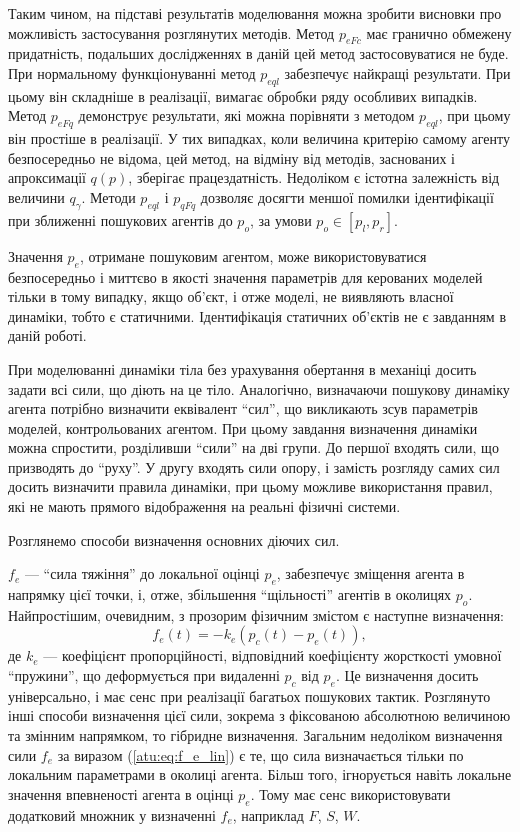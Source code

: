 \documentclass[a4paper,13pt]{atuaref}
\begin{document}
Таким чином, на підставі результатів моделювання можна зробити висновки про
можливість застосування розглянутих методів. Метод $ p_{eFc} $ має гранично
обмежену придатність, подальших дослідженнях в даній цей метод застосовуватися
не буде. При нормальному функціонуванні метод $ p_{eql} $ забезпечує найкращі
результати. При цьому він складніше в реалізації, вимагає обробки ряду
особливих випадків. Метод $ p_{eFq} $ демонструє результати, які можна
порівняти з методом $ p_ {eql} $, при цьому він простіше в реалізації. У тих
випадках, коли величина критерію самому агенту безпосередньо не відома, цей
метод, на відміну від методів, заснованих і апроксимації $ q (p) $, зберігає
працездатність. Недоліком є істотна залежність від величини $ q_\gamma $.
Методи $ p_ {eql} $ і $ p_ {qFq} $ дозволяє досягти меншої помилки
ідентифікації при зближенні пошукових агентів до $ p_o $, за умови $ p_o \in [p_l, p_r] $.



Значення $ p_e $, отримане пошуковим агентом, може використовуватися
безпосередньо і миттєво в якості значення параметрів для керованих моделей
тільки в тому випадку, якщо об'єкт, і отже моделі, не виявляють власної
динаміки, тобто є статичними. Ідентифікація статичних об'єктів не є завданням в
даній роботі.

При моделюванні динаміки тіла без урахування обертання в механіці досить задати
всі сили, що діють на це тіло. Аналогічно, визначаючи пошукову динаміку агента
потрібно визначити еквівалент ``сил'', що викликають зсув параметрів моделей,
контрольованих агентом. При цьому завдання визначення динаміки можна спростити,
розділивши ``сили'' на дві групи. До першої входять сили, що призводять до ``руху''.
У другу входять сили опору, і замість розгляду самих сил досить
визначити правила динаміки, при цьому можливе використання правил, які не мають
прямого відображення на реальні фізичні системи.

Розглянемо способи визначення основних діючих сил.

$f_e $ --- ``сила тяжіння'' до локальної оцінці $ p_e $, забезпечує зміщення
агента в напрямку цієї точки, і, отже, збільшення ``щільності'' агентів в
околицях $p_o$. Найпростішим, очевидним, з прозорим фізичним змістом є
наступне визначення:
%
\begin{equation}
  f_e(t) = - k_e \left( p_c(t) - p_e(t) \right)  ,
  \label{atu:eq:f_e_lin}
\end{equation}
%
де $ k_e $ --- коефіцієнт пропорційності, відповідний коефіцієнту жорсткості
умовної ``пружини'', що деформується при видаленні $ p_c $ від $ p_e $. Це
визначення досить універсально, і має сенс при реалізації багатьох пошукових
тактик. Розглянуто інші способи визначення цієї сили, зокрема з фіксованою
абсолютною величиною та змінним напрямком, то гібридне визначення.
Загальним недоліком визначення сили $ f_e $ за виразом (\ref{atu:eq:f_e_lin})
є те, що сила визначається тільки по локальним параметрами в околиці
агента. Більш того, ігнорується навіть локальне значення впевненості агента в
оцінці $ p_e $. Тому має сенс використовувати додатковий множник у визначенні $f_e$,
наприклад $F$, $S$, $W$.
\end{document}
